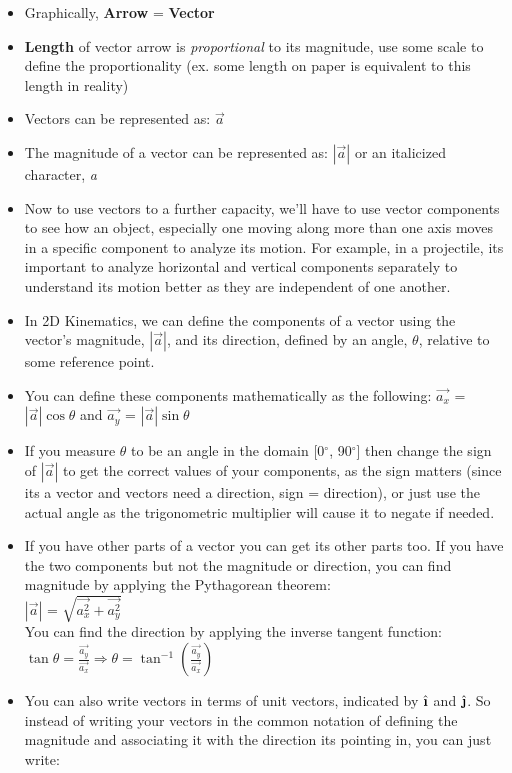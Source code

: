 \documentclass[openany]{book}
\newcommand{\ihat}{\hat{\textbf{\i}}}
\newcommand{\jhat}{\hat{\textbf{\j}}}
\begin{document}
\begin{itemize}
    \item Graphically, {\bfseries{Arrow}} = {\bfseries{Vector}}
    \item {\bfseries{Length}} of vector arrow is {\textit{proportional}} to its magnitude, use some scale to define the proportionality (ex. some length on paper is equivalent to this length in reality)
    \item Vectors can be represented as: $\vec{a}$
    \item The magnitude of a vector can be represented as: $|\vec{a}|$ or an italicized character, {\textit{a}}
    \item Now to use vectors to a further capacity, we'll have to use vector components to see how an object, especially one moving along more than one axis moves in a specific component to analyze its motion. For example, in a projectile, its important to analyze horizontal and vertical components separately to understand its motion better as they are independent of one another.
    \item In 2D Kinematics, we can define the components of a vector using the vector's magnitude, $|\vec{a}|$, and its direction, defined by an angle, $\theta$, relative to some reference point.
    \item You can define these components mathematically as the following: \break $\vec{a_x}$ = $|\vec{a}|\cos{\theta}$ and $\vec{a_y}$ = $|\vec{a}|\sin{\theta}$
    \item If you measure $\theta$ to be an angle in the domain [0$^{\circ}$, 90$^{\circ}$] then change the sign of $|\vec{a}|$ to get the correct values of your components, as the sign matters (since its a vector and vectors need a direction, sign = direction), or just use the actual angle as the trigonometric multiplier will cause it to negate if needed.
    \item If you have other parts of a vector you can get its other parts too. If you have the two components but not the magnitude or direction, you can find magnitude by applying the Pythagorean theorem:
    \\
    $|\vec{a}|$ = $\sqrt{\vec{a^{2}_x} + \vec{a^{2}_y}}$
    \\
    You can find the direction by applying the inverse tangent function:
    \\
    $\tan{\theta} = \frac{\vec{a_y}}{\vec{a_x}} 
    \Longrightarrow \theta = \tan^{-1}(\frac{\vec{a_y}}{\vec{a_x}})$
    \item You can also write vectors in terms of unit vectors, indicated by ${\ihat}$ and ${\jhat}$. So instead of writing your vectors in the common notation of defining the magnitude and associating it with the direction its pointing in, you can just write:

\end{itemize}
\end{document}
